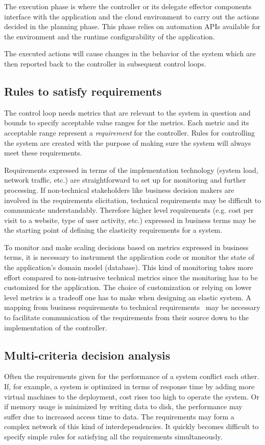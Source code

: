 \documentclass[english]{tktltiki2}
\theoremstyle{definition}
\theoremstyle{remark}
\begin{document}
The execution phase is where the controller or its delegate effector components
interface with the application and the cloud environment to carry out the actions
decided in the planning phase. This phase relies on automation APIs available
for the environment and the runtime configurability of the application.

The executed actions will cause changes in the behavior of the system which are
then reported back to the controller in subsequent control loops.

\subsection{Rules to satisfy requirements} The control loop needs metrics that
are relevant to the system in question and bounds to specify acceptable value
ranges for the metrics. Each metric and its acceptable range represent a
\emph{requirement} for the controller. Rules for controlling the system are
created with the purpose of making sure the system will always meet these
requirements.

Requirements expressed in terms of the implementation technology (system load,
network traffic, etc.) are straightforward to set up for monitoring and further
processing. If non-technical stakeholders like business decision makers are
involved in the requirements elicitation, technical requirements may be
difficult to communicate understandably. Therefore higher level requirements
(e.g. cost per visit to a website, type of user activity, etc.) expressed in
business terms may be the starting point of defining the elasticity requirements
for a system.

To monitor and make scaling decisions based on metrics expressed in business
terms, it is necessary to instrument the application code or monitor the state
of the application's domain model (database). This kind of monitoring takes more
effort compared to non-intrusive technical metrics since the monitoring has to
be customized for the application. The choice of customization or relying on
lower level metrics is a tradeoff one has to make when designing an elastic
system. A mapping from business requirements to technical requirements~
\cite{Chen2008}\cite{Emeakaroha2010}\cite{Wu2011}\cite{Suleiman2011} may be
necessary to facilitate communication of the requirements from their source down
to the implementation of the controller.

\subsection{Multi-criteria decision analysis} Often the requirements given for
the performance of a system conflict each other. If, for example, a system is
optimized in terms of response time by adding more virtual machines to the
deployment, cost rises too high to operate the system. Or if memory usage is
minimized by writing data to disk, the performance may suffer due to increased
access time to data. The requirements may form a complex network of this kind of
interdependencies. It quickly becomes difficult to specify simple rules for
satisfying all the requirements simultaneously.
\end{document}
